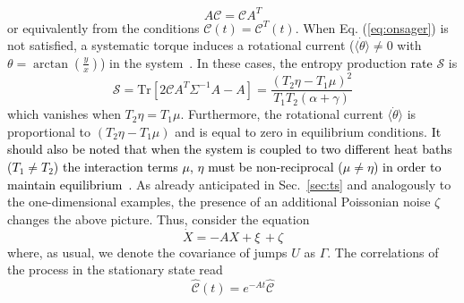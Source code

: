 \documentclass[12pt]{iopart}
\newcommand{\lx} {\left}
\newcommand{\rx} {\right}
\newcommand{\cS} {\mathcal{S}}
\newcommand{\cC} {\mathcal{C}}
\begin{document}
\begin{equation}
    A\cC=\cC A^T
\label{eq:onsager}
\end{equation}
or equivalently from the conditions $\cC(t)=\cC^T(t)$. When Eq. (\ref{eq:onsager}) is not satisfied, a systematic torque induces a rotational current ($\langle\dot{\theta}\rangle\neq 0$ with $\theta=\arctan\lx(\frac{y}{x}\rx)$) in the system~\cite{crisanti2012nonequilibrium,baldassarri2020engineered}. In these cases, the entropy production \textcolor{black}{rate} $\cS$ is 
\begin{equation}
    \cS=\text{Tr}\lx[2 \cC A^T \Sigma^{-1}A - A \rx]=\frac{\lx(T_2\eta-T_1\mu\rx)^2}{T_1T_2(\alpha+\gamma)}
    \label{eq:epr_bg}
\end{equation}
which vanishes when $T_2\eta=T_1\mu$. Furthermore, the rotational current $\langle\dot{\theta}\rangle$ is proportional to  $\lx(T_2\eta-T_1\mu\rx)$ and is equal to zero in equilibrium conditions. \textcolor{black}{It should also be noted that when the system is coupled to two different heat baths ($T_1\neq T_2$) the interaction terms $\mu$, $\eta$ must be non-reciprocal ($\mu\neq\eta$) in order to maintain equilibrium~\cite{loos2020irreversibility}.} As already anticipated in Sec.~\ref{sec:ts} and analogously to the one-dimensional examples, the presence of an additional Poissonian noise $\zeta$ changes the above picture. Thus, consider the equation
\begin{equation}
    \dot{X}=-AX+\xi\,+\zeta
\end{equation}
where, as usual, we denote the covariance of jumps $U$ as $\Gamma$. The correlations of the process in the stationary state read
\begin{equation}
\hat{\cC}(t)=e^{-At}\hat{\cC}
\label{eq:correlation_pbg}
\end{equation}
\end{document}
